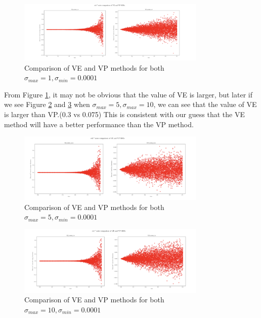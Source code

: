 \begin{figure}[h!]
    \centering
    \includegraphics[width=0.8\textwidth,height= 0.35\textwidth]{Figures/sde1.png}
    \caption{Comparison of VE and VP methods for both $\sigma_{max} = 1, \sigma_{min} = 0.0001$} \label{fig:sde1}
\end{figure}

From Figure \ref{fig:sde1}, it may not be obvious that the value of VE is larger, but later if we see Figure \ref{fig:sde5} and \ref{fig:sde10} when $\sigma_{max} = 5, \sigma_{max} = 10$, we can see that the value of VE is larger than VP.(0.3 vs 0.075) This is consistent with our guess that the VE method will have a better performance than the VP method.

\begin{figure}[h!]
    \centering
    \includegraphics[width=0.8\textwidth,height = 0.35\textwidth]{Figures/sde5.png}
    \caption{Comparison of VE and VP methods for both $\sigma_{max} = 5, \sigma_{min} = 0.0001$}\label{fig:sde5}
\end{figure}

\begin{figure}[h!]
    \centering
    \includegraphics[width=0.8\textwidth, height = 0.35\textwidth]{Figures/sde10.png}
    \caption{Comparison of VE and VP methods for both $\sigma_{max} = 10, \sigma_{min} = 0.0001$}\label{fig:sde10}
\end{figure}

